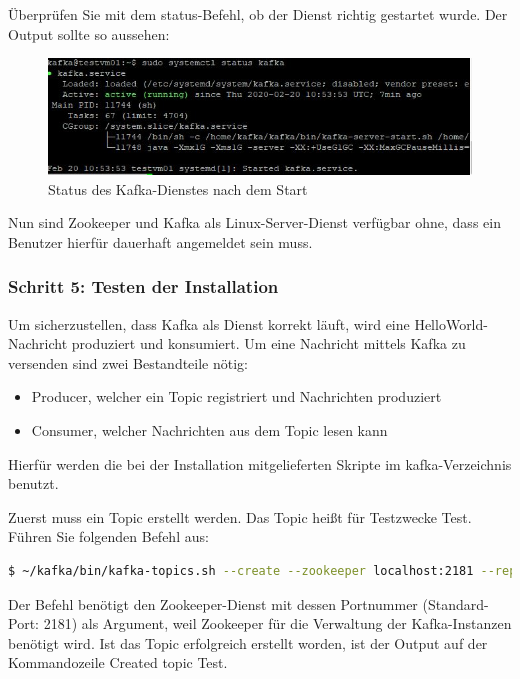 \documentclass[a4paper,titlepage,halfparskip,12pt]{scrreprt}
\begin{document}
\begin{onehalfspacing}
\smallskip

Überprüfen Sie mit dem \glqq status\grqq -Befehl, ob der Dienst richtig gestartet wurde. Der Output sollte so aussehen:

\begin{figure}[h]
	\centering
	\includegraphics{images/StatusKafka}
	\caption{Status des Kafka-Dienstes nach dem Start}
	\label{img:StatusZookeeper}
\end{figure}

Nun sind Zookeeper und Kafka als Linux-Server-Dienst verfügbar ohne, dass ein Benutzer hierfür dauerhaft angemeldet sein muss.

\subsubsection*{Schritt 5: Testen der Installation}

Um sicherzustellen, dass Kafka als Dienst korrekt läuft, wird eine \glqq HelloWorld\grqq -Nachricht produziert und konsumiert. Um eine Nachricht mittels Kafka zu versenden sind zwei Bestandteile nötig:

\begin{itemize}
\item Producer, welcher ein Topic registriert und Nachrichten produziert
\item Consumer, welcher Nachrichten aus dem Topic lesen kann
\end{itemize}

Hierfür werden die bei der Installation mitgelieferten Skripte im \glqq kafka\grqq -Verzeichnis benutzt.

Zuerst muss ein Topic erstellt werden. Das Topic heißt für Testzwecke \glqq Test\grqq.  Führen Sie folgenden Befehl aus:

\smallskip

\begin{lstlisting}[language=Bash]
$ ~/kafka/bin/kafka-topics.sh --create --zookeeper localhost:2181 --replication-factor 1 --partitions 1 --topic Test
\end{lstlisting}

Der Befehl benötigt den Zookeeper-Dienst mit dessen Portnummer (Standard-Port: 2181) als Argument, weil Zookeeper für die Verwaltung der Kafka-Instanzen benötigt wird. Ist das Topic erfolgreich erstellt worden, ist der Output auf der Kommandozeile \glqq Created topic Test.\grqq


\end{onehalfspacing}
\end{document}
